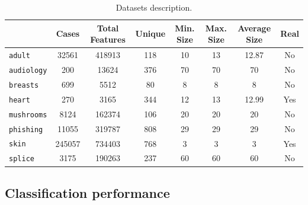 \documentclass[sigconf,edbt]{acmart-edbt-workshops}
\begin{document}
\begin{table}[tb]
\begin{center}
  \caption{Datasets description. }
  \begin{small}
  \begin{tabular}{|l|c|c|c|c|c|c|c|}
    \hline
     & Cases & Total Features & Unique & Min. Size & Max. Size & Average Size & Real \\
    \hline
    \texttt{adult} & 32561 & 418913 & 118 & 10 & 13 & 12.87 & No\\
    \texttt{audiology} & 200 & 13624 & 376 & 70 & 70 & 70 & No\\
    \texttt{breasts} & 699 & 5512 & 80 & 8 & 8 & 8 & No \\
    \texttt{heart} & 270 & 3165 & 344 & 12 & 13 & 12.99 & Yes\\
    \texttt{mushrooms} & 8124 & 162374 & 106 & 20 & 20 & 20 & No\\
    \texttt{phishing} & 11055 & 319787 & 808 & 29 & 29 & 29 & No\\
    \texttt{skin} & 245057 & 734403 & 768 & 3 & 3 & 3 & Yes\\
    \texttt{splice} & 3175 & 190263 & 237 & 60 & 60 & 60 & No\\
    \hline
  \end{tabular}
  \end{small}
  \label{table:dataset}
\end{center}
\end{table}
\subsection{Classification performance}
\end{document}
